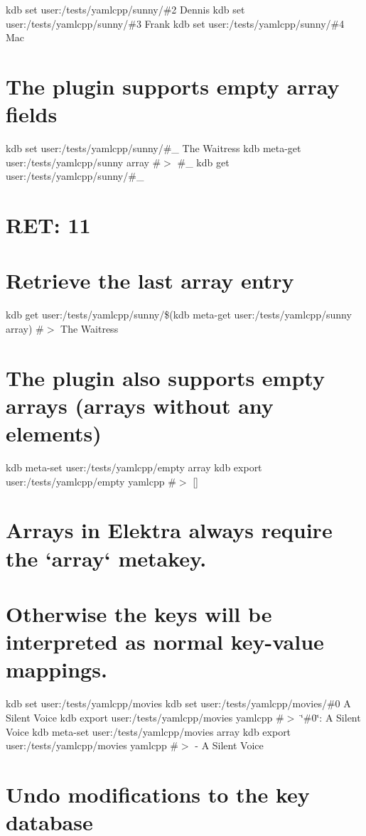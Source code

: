 kdb set user\+:/tests/yamlcpp/sunny/\#2 Dennis kdb set user\+:/tests/yamlcpp/sunny/\#3 Frank kdb set user\+:/tests/yamlcpp/sunny/\#4 Mac\hypertarget{autotoc_md817_autotoc_md839}{}\section{The plugin supports empty array fields}\label{autotoc_md817_autotoc_md839}
kdb set user\+:/tests/yamlcpp/sunny/\#\+\_ \textquotesingle{}The Waitress\textquotesingle{} kdb meta-\/get user\+:/tests/yamlcpp/sunny array \#$>$ \#\+\_ kdb get user\+:/tests/yamlcpp/sunny/\#\+\_ \hypertarget{autotoc_md817_autotoc_md840}{}\section{R\+E\+T\+: 11}\label{autotoc_md817_autotoc_md840}
\hypertarget{autotoc_md817_autotoc_md841}{}\section{Retrieve the last array entry}\label{autotoc_md817_autotoc_md841}
kdb get user\+:/tests/yamlcpp/sunny/\$(kdb meta-\/get user\+:/tests/yamlcpp/sunny array) \#$>$ The Waitress\hypertarget{autotoc_md817_autotoc_md842}{}\section{The plugin also supports empty arrays (arrays without any elements)}\label{autotoc_md817_autotoc_md842}
kdb meta-\/set user\+:/tests/yamlcpp/empty array \textquotesingle{}\textquotesingle{} kdb export user\+:/tests/yamlcpp/empty yamlcpp \#$>$ \mbox{[}\mbox{]}\hypertarget{autotoc_md817_autotoc_md843}{}\section{Arrays in Elektra always require the `array` metakey.}\label{autotoc_md817_autotoc_md843}
\hypertarget{autotoc_md817_autotoc_md844}{}\section{Otherwise the keys will be interpreted as normal key-\/value mappings.}\label{autotoc_md817_autotoc_md844}
kdb set user\+:/tests/yamlcpp/movies kdb set user\+:/tests/yamlcpp/movies/\#0 \textquotesingle{}A Silent Voice\textquotesingle{} kdb export user\+:/tests/yamlcpp/movies yamlcpp \#$>$ \char`\"{}\#0\char`\"{}\+: A Silent Voice kdb meta-\/set user\+:/tests/yamlcpp/movies array \textquotesingle{}\textquotesingle{} kdb export user\+:/tests/yamlcpp/movies yamlcpp \#$>$ -\/ A Silent Voice\hypertarget{autotoc_md817_autotoc_md845}{}\section{Undo modifications to the key database}\label{autotoc_md817_autotoc_md845}
